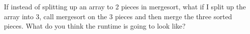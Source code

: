 If instead of splitting up an array to 2 pieces in mergesort,
what if I split up the array into 3, call mergesort on the 3 pieces
and then merge the three sorted pieces.
What do you think the runtime is going to look like?
